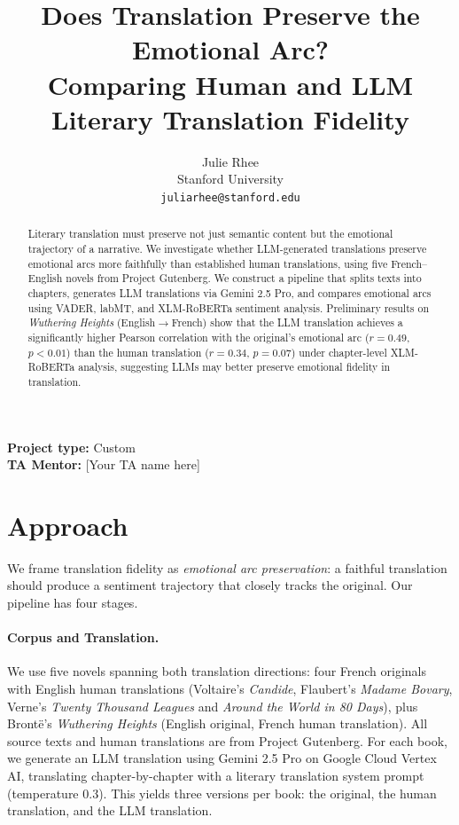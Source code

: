 \documentclass[11pt,a4paper]{article}
\title{Does Translation Preserve the Emotional Arc? \\
Comparing Human and LLM Literary Translation Fidelity}
\author{
  Julie Rhee \\
  Stanford University \\
  \texttt{juliarhee@stanford.edu}
}
\begin{document}
\maketitle

\noindent \textbf{Project type:} Custom \\
\textbf{TA Mentor:} [Your TA name here]

\begin{abstract}
Literary translation must preserve not just semantic content but the emotional trajectory of a narrative.
We investigate whether LLM-generated translations preserve emotional arcs more faithfully than established human translations, using five French--English novels from Project Gutenberg.
We construct a pipeline that splits texts into chapters, generates LLM translations via Gemini 2.5 Pro, and compares emotional arcs using VADER, labMT, and XLM-RoBERTa sentiment analysis.
Preliminary results on \textit{Wuthering Heights} (English$\to$French) show that the LLM translation achieves a significantly higher Pearson correlation with the original's emotional arc ($r{=}0.49$, $p{<}0.01$) than the human translation ($r{=}0.34$, $p{=}0.07$) under chapter-level XLM-RoBERTa analysis, suggesting LLMs may better preserve emotional fidelity in translation.
\end{abstract}

\section{Approach}

We frame translation fidelity as \textit{emotional arc preservation}: a faithful translation should produce a sentiment trajectory that closely tracks the original.
Our pipeline has four stages.

\paragraph{Corpus and Translation.}
We use five novels spanning both translation directions:
four French originals with English human translations (Voltaire's \textit{Candide}, Flaubert's \textit{Madame Bovary}, Verne's \textit{Twenty Thousand Leagues} and \textit{Around the World in 80 Days}), plus Bront\"{e}'s \textit{Wuthering Heights} (English original, French human translation).
All source texts and human translations are from Project Gutenberg.
For each book, we generate an LLM translation using Gemini 2.5 Pro on Google Cloud Vertex AI, translating chapter-by-chapter with a literary translation system prompt (temperature 0.3).
This yields three versions per book: the original, the human translation, and the LLM translation.
\end{document}
